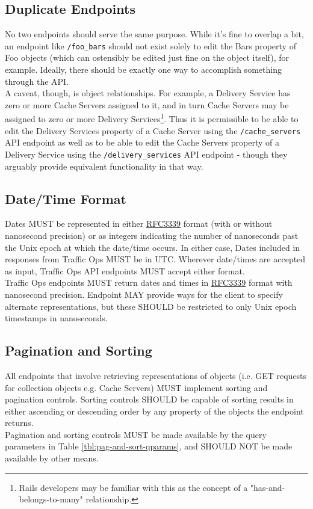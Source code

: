 \documentclass{article}
\newcommand{\code}[1]{\texttt{\color{inlinecodecolor}#1}}
\begin{document}
\subsection{Duplicate Endpoints\label{sec:duplicate-endpoints}}
No two endpoints should serve the same purpose. While it's fine to overlap a bit, an endpoint like \code{/foo\_bars} should not exist solely to
edit the Bars property of Foo objects (which can ostensibly be edited just fine on the object itself), for example. Ideally, there should be
exactly one way to accomplish something through the API.\\
A caveat, though, is object relationships. For example, a Delivery Service has zero or more Cache Servers assigned to it, and in turn Cache
Servers may be assigned to zero or more Delivery Services\footnote{Rails developers may be familiar with this as the concept of a
"has-and-belongs-to-many" relationship.}. Thus it is permissible to be able to edit the Delivery Services property of a Cache Server using the
\code{/cache\_servers} API endpoint as well as to be able to edit the Cache Servers property of a Delivery Service using the
\code{/delivery\_services} API endpoint - though they arguably provide equivalent functionality in that way.

\subsection{Date/Time Format\label{sec:datetime}}
Dates MUST be represented in either \href{https://tools.ietf.org/html/rfc3339}{RFC3339} format (with or without nanosecond precision) or as
integers indicating the number of nanoseconds past the Unix epoch at which the date/time occurs. In either case, Dates included in responses
from Traffic Ops MUST be in UTC. Wherever date/times are accepted as input, Traffic Ops API endpoints MUST accept either format.\\
Traffic Ops endpoints MUST return dates and times in \href{https://tools.ietf.org/html/rfc3339}{RFC3339} format with nanosecond precision.
Endpoint MAY provide ways for the client to specify alternate representations, but these SHOULD be restricted to only Unix epoch timestamps
in nanoseconds.

\subsection{Pagination and Sorting}
All endpoints that involve retrieving representations of objects (i.e. GET requests for collection objects e.g. Cache Servers) MUST implement
sorting and pagination controls. Sorting controls SHOULD be capable of sorting results in either ascending or descending order by any property
of the objects the endpoint returns.\\
Pagination and sorting controls MUST be made available by the query parameters in Table \ref{tbl:pag-and-sort-qparams}, and SHOULD NOT be made
available by other means.
\end{document}
